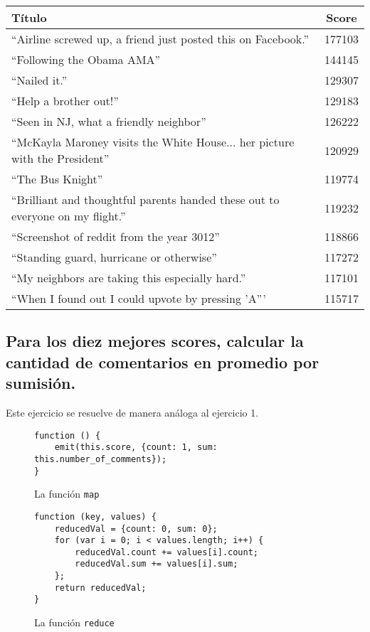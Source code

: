 \documentclass[11pt, a4paper, twoside]{article}
\begin{document}
\begin{center}
  \begin{tabular}{l|c}
    \textbf{Título} & \textbf{Score} \\ \hline
    ``Airline screwed up, a friend just posted this on Facebook.'' & 177103 \\
    ``Following the Obama AMA'' & 144145 \\
    ``Nailed it.'' & 129307 \\
    ``Help a brother out!'' & 129183 \\
    ``Seen in NJ, what a friendly neighbor'' & 126222 \\
    ``McKayla Maroney visits the White House... her picture with the President'' & 120929 \\
    ``The Bus Knight'' & 119774 \\
    ``Brilliant and thoughtful parents handed these out to everyone on my flight.'' & 119232 \\
    ``Screenshot of reddit from the year 3012'' & 118866 \\
    ``Standing guard, hurricane or otherwise'' & 117272 \\
    ``My neighbors are taking this especially hard.'' & 117101 \\
    ``When I found out I could upvote by pressing 'A''' & 115717

  \end{tabular}
\end{center}

\newpage
\subsection{Para los diez mejores scores, calcular la cantidad de comentarios en promedio por sumisión.}

Este ejercicio se resuelve de manera análoga al ejercicio 1.

\begin{figure}[H]
\caption{La función \texttt{map}}
\centering
\begin{verbatim}
function () {
    emit(this.score, {count: 1, sum: this.number_of_comments});
}
\end{verbatim}
\end{figure}

\begin{figure}[H]
\caption{La función \texttt{reduce}}
\centering
\begin{verbatim}
function (key, values) {
    reducedVal = {count: 0, sum: 0};
    for (var i = 0; i < values.length; i++) {
        reducedVal.count += values[i].count;
        reducedVal.sum += values[i].sum;
    };
    return reducedVal;
}
\end{verbatim}
\end{figure}
\end{document}
